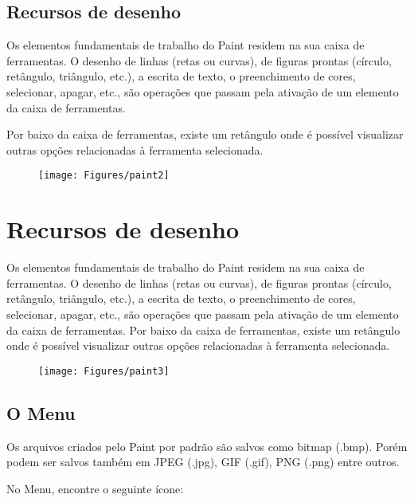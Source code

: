 \documentclass[12pt]{article}
\begin{document}
			\subsection{Recursos de desenho}	
			
			Os elementos fundamentais de trabalho do Paint residem na sua caixa de ferramentas. O desenho de linhas (retas ou curvas), de figuras prontas (círculo, retângulo, triângulo, etc.), a escrita de texto, o preenchimento de cores, selecionar, apagar, etc., são operações que passam pela ativação de um elemento da caixa de ferramentas. 
			
			Por baixo da caixa de ferramentas, existe um retângulo onde é possível visualizar outras opções relacionadas à ferramenta selecionada.
			
			
			\begin{figure}[!h]
				\centering
				\texttt{[image: Figures/paint2]}
				\label{fig:paint2}
			\end{figure}
			
			\section{Recursos de desenho}
			
			Os elementos fundamentais de trabalho do Paint residem na sua caixa de ferramentas. O desenho de linhas (retas ou curvas), de figuras prontas (círculo, retângulo, triângulo, etc.), a escrita de texto, o preenchimento de cores, selecionar, apagar, etc., são operações que passam pela ativação de um elemento da caixa de ferramentas. Por baixo da caixa de ferramentas, existe um retângulo onde é possível visualizar outras opções relacionadas à ferramenta selecionada.
			
			
				
			\begin{figure}[!h]
				\centering
				\texttt{[image: Figures/paint3]}
				\label{fig:paint3}
			\end{figure}
			
		
			\subsection{O Menu}
			
			Os arquivos criados pelo Paint por padrão são salvos como bitmap (.bmp). Porém podem ser salvos também em JPEG (.jpg), GIF (.gif), PNG (.png) entre outros.
			
			No Menu, encontre o seguinte ícone:
			
\end{document}
